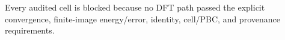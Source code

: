 Every audited cell is blocked because no DFT path passed the explicit convergence, finite-image energy/error, identity, cell/PBC, and provenance requirements.

